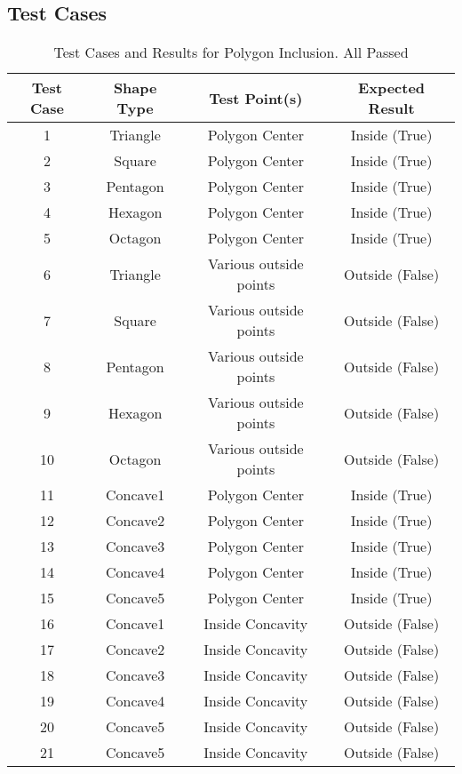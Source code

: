 \documentclass{labReport}
\begin{document}
\begin{multicols*}{2}
\section{Test Cases}
\begin{table}[H]
\centering
\begin{tabular}{|c|c|c|c|}
\hline
\textbf{Test Case} & \textbf{Shape Type} & \textbf{Test Point(s)} & \textbf{Expected Result} \\ \hline
1 & Triangle      & Polygon Center  & Inside (True) \\ \hline
2 & Square        & Polygon Center      & Inside (True) \\ \hline
3 & Pentagon      & Polygon Center      & Inside (True) \\ \hline
4 & Hexagon       & Polygon Center      & Inside (True) \\ \hline
5 & Octagon       & Polygon Center      & Inside (True) \\ \hline
6 & Triangle      & Various outside points & Outside (False) \\ \hline
7 & Square        & Various outside points & Outside (False) \\ \hline
8 & Pentagon      & Various outside points & Outside (False) \\ \hline
9 & Hexagon       & Various outside points & Outside (False) \\ \hline
10 & Octagon      & Various outside points & Outside (False) \\ \hline
11 & Concave1     & Polygon Center        & Inside (True) \\ \hline
12 & Concave2     & Polygon Center        & Inside (True) \\ \hline
13 & Concave3     & Polygon Center        & Inside (True) \\ \hline
14 & Concave4     & Polygon Center        & Inside (True) \\ \hline
15 & Concave5     & Polygon Center        & Inside (True) \\ \hline
16 & Concave1     & Inside Concavity      & Outside (False) \\ \hline
17 & Concave2     & Inside Concavity      & Outside (False) \\ \hline
18 & Concave3     & Inside Concavity      & Outside (False) \\ \hline
19 & Concave4     & Inside Concavity      & Outside (False) \\ \hline
20 & Concave5     & Inside Concavity      & Outside (False) \\ \hline
21 & Concave5     & Inside Concavity      & Outside (False) \\ \hline
\end{tabular}
\caption{Test Cases and Results for Polygon Inclusion. All Passed}
\label{tab:test_cases}
\end{table}
    


\end{multicols*}
\end{document}
